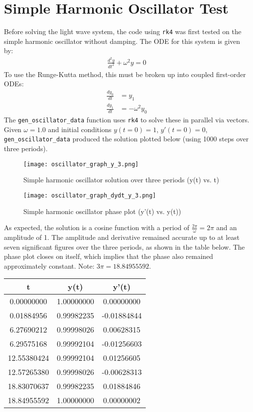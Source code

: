 \documentclass[12pt]{article}
\begin{document}
\section{Simple Harmonic Oscillator Test}
Before solving the light wave system, the code using \texttt{rk4} was first tested on the simple harmonic oscillator without damping. The ODE for this system is given by:
\begin{align*}
\frac{d^2y}{dt^2} + \omega^2y = 0
\end{align*}
To use the Runge-Kutta method, this must be broken up into coupled first-order ODEs:
\begin{align*}
\frac{dy_0}{dt} &= y_1 \\
\frac{dy_1}{dt} &= -\omega^2y_0
\end{align*}
The \texttt{gen\_oscillator\_data} function uses \texttt{rk4} to solve these in parallel via vectors. Given $\omega = 1.0$ and initial conditions $y(t = 0) = 1$, $y'(t = 0) = 0$, \texttt{gen\_oscillator\_data} produced the solution plotted below (using 1000 steps over three periods).
\begin{figure}[H]
\begin{minipage}[b]{0.45\linewidth}
\centering
\texttt{[image: oscillator\_graph\_y\_3.png]}
\caption{Simple harmonic oscillator solution over three periods (y(t) vs. t)}
\label{fig:figure1}
\end{minipage}
\hspace{0.5cm}
\begin{minipage}[b]{0.45\linewidth}
\centering
\texttt{[image: oscillator\_graph\_dydt\_y\_3.png]}
\caption{Simple harmonic oscillator phase plot (y'(t) vs. y(t))}
\label{fig:figure2}
\end{minipage}
\end{figure}
As expected, the solution is a cosine function with a period of $\frac{2\pi}{\omega} = 2\pi$ and an amplitude of 1. The amplitude and derivative remained accurate up to at least seven significant figures over the three periods, as shown in the table below. The phase plot closes on itself, which implies that the phase also remained approximately constant. Note: $3\pi = 18.84955592$.
\begin{center}
\begin{tabular}{ c | c | c }
t & y(t) & y'(t)\\ \hline
0.00000000 & 1.00000000 & 0.00000000 \\
0.01884956 & 0.99982235 & -0.01884844 \\ \hline
6.27690212 & 0.99998026 & 0.00628315 \\
6.29575168 & 0.99992104 & -0.01256603 \\ \hline
12.55380424 & 0.99992104 & 0.01256605 \\
12.57265380 & 0.99998026 & -0.00628313 \\ \hline
18.83070637 & 0.99982235 & 0.01884846 \\
18.84955592 & 1.00000000 & 0.00000002 \\
\end{tabular}
\end{center}
\end{document}
